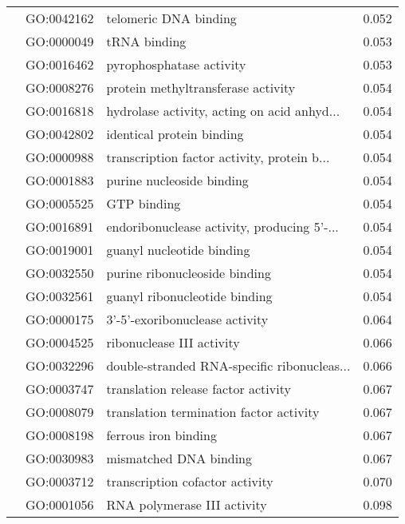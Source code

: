 \begin{longtable}{lllr}
   & GO:0042162 &                        telomeric DNA binding &         0.052 \\
   & GO:0000049 &                                 tRNA binding &         0.053 \\
   & GO:0016462 &                     pyrophosphatase activity &         0.053 \\
   & GO:0008276 &           protein methyltransferase activity &         0.054 \\
   & GO:0016818 &  hydrolase activity, acting on acid anhyd... &         0.054 \\
   & GO:0042802 &                    identical protein binding &         0.054 \\
   & GO:0000988 &  transcription factor activity, protein b... &         0.054 \\
   & GO:0001883 &                    purine nucleoside binding &         0.054 \\
   & GO:0005525 &                                  GTP binding &         0.054 \\
   & GO:0016891 &  endoribonuclease activity, producing 5'-... &         0.054 \\
   & GO:0019001 &                    guanyl nucleotide binding &         0.054 \\
   & GO:0032550 &                purine ribonucleoside binding &         0.054 \\
   & GO:0032561 &                guanyl ribonucleotide binding &         0.054 \\
   & GO:0000175 &               3'-5'-exoribonuclease activity &         0.064 \\
   & GO:0004525 &                    ribonuclease III activity &         0.066 \\
   & GO:0032296 &  double-stranded RNA-specific ribonucleas... &         0.066 \\
   & GO:0003747 &          translation release factor activity &         0.067 \\
   & GO:0008079 &      translation termination factor activity &         0.067 \\
   & GO:0008198 &                         ferrous iron binding &         0.067 \\
   & GO:0030983 &                       mismatched DNA binding &         0.067 \\
   & GO:0003712 &              transcription cofactor activity &         0.070 \\
   & GO:0001056 &                  RNA polymerase III activity &         0.098 \\
\end{longtable}
